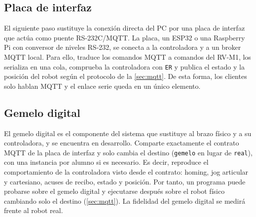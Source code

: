 \subsection{Placa de interfaz}

El siguiente paso sustituye la conexión directa del PC por una placa de interfaz que actúa como puente RS-232C/MQTT. La placa, un ESP32 o una Raspberry Pi con conversor de niveles RS-232, se conecta a la controladora y a un broker MQTT local. Para ello, traduce los comandos MQTT a comandos del RV-M1, los serializa en una cola, comprueba la controladora con \texttt{ER} y publica el estado y la posición del robot según el protocolo de la \cref{sec:mqtt}. De esta forma, los clientes solo hablan MQTT y el enlace serie queda en un único elemento. 

\subsection{Gemelo digital}

El gemelo digital es el componente del sistema que sustituye al brazo físico y a su controladora, y se encuentra en desarrollo. Comparte exactamente el contrato MQTT de la placa de interfaz y solo cambia el destino (\texttt{gemelo} en lugar de \texttt{real}), con una instancia por alumno si es necesario. Es decir, reproduce el comportamiento de la controladora visto desde el contrato: homing, jog articular y cartesiano, acuses de recibo, estado y posición. Por tanto, un programa puede probarse sobre el gemelo digital y ejecutarse después sobre el robot físico cambiando solo el destino (\cref{sec:mqtt}). La fidelidad del gemelo digital se medirá frente al robot real. 
